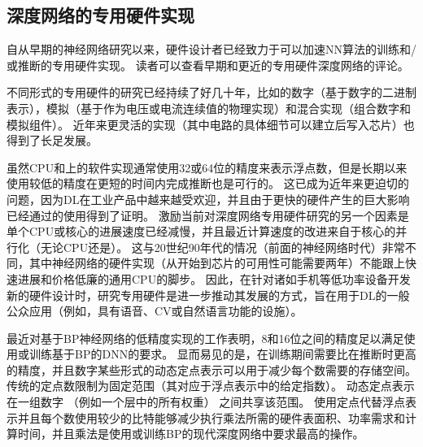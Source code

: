 \subsection{深度网络的专用硬件实现}
\label{sec:specialized_hardware_implementations_of_deep_networks}

自从早期的神经网络研究以来，硬件设计者已经致力于可以加速\gls{NN}算法的训练和/或推断的专用硬件实现。
读者可以查看早期和更近的专用硬件深度网络的评论\citep{Lindsey+Lindblad-1994,Beiu-et-al-2003,Misra+Saha-2010}。


不同形式的专用硬件\citep{Graf+Jackel-1989,Mead+Ismail-2012,Kim-et-al-2009,Pham-et-al-2012,Chen-et-al-IEEE2014,Chen-et-al-ACM2014}的研究已经持续了好几十年，比如的数字（基于数字的二进制表示），模拟\citep{Graf+Jackel-1989,Mead+Ismail-2012}（基于作为电压或电流连续值的物理实现）和混合实现（组合数字和模拟组件）。
近年来更灵活的实现（其中电路的具体细节可以建立后写入芯片）也得到了长足发展。



虽然CPU和上的软件实现通常使用32或64位的精度来表示浮点数，但是长期以来使用较低的精度在更短的时间内完成推断也是可行的\citep{Holt-et-al-1991,Holi+Hwang-1993,Presley-et-al-1994,Simard+Graf-NIPS1994,Wawrzynek-et-al-IEEE1996,Savich-et-al-2007}。
这已成为近年来更迫切的问题，因为\gls{DL}在工业产品中越来越受欢迎，并且由于更快的硬件产生的巨大影响已经通过的使用得到了证明。
激励当前对深度网络专用硬件研究的另一个因素是单个CPU或核心的进展速度已经减慢，并且最近计算速度的改进来自于核心的并行化（无论CPU还是）。
这与20世纪90年代的情况（前面的神经网络时代）非常不同，其中神经网络的硬件实现（从开始到芯片的可用性可能需要两年）不能跟上快速进展和价格低廉的通用CPU的脚步。
因此，在针对诸如手机等低功率设备开发新的硬件设计时，研究专用硬件是进一步推动其发展的方式，旨在用于\gls{DL}的一般公众应用（例如，具有语音、\gls{CV}或自然语言功能的设施）。


最近对基于\gls{BP}神经网络的低精度实现的工作\citep{Vanhoucke-et-al-2011,Courbariaux-et-al-ICLR2015workshop,Gupta-et-al-2015}表明，8和16位之间的精度足以满足使用或训练基于\gls{BP}的\gls{DNN}的要求。
显而易见的是，在训练期间需要比在推断时更高的精度，并且数字某些形式的动态定点表示可以用于减少每个数需要的存储空间。
传统的定点数限制为固定范围（其对应于浮点表示中的给定指数）。
动态定点表示在一组数字 （例如一个层中的所有权重） 之间共享该范围。
使用定点代替浮点表示并且每个数使用较少的比特能够减少执行乘法所需的硬件表面积、功率需求和计算时间，并且乘法是使用或训练\gls{BP}的现代深度网络中要求最高的操作。



